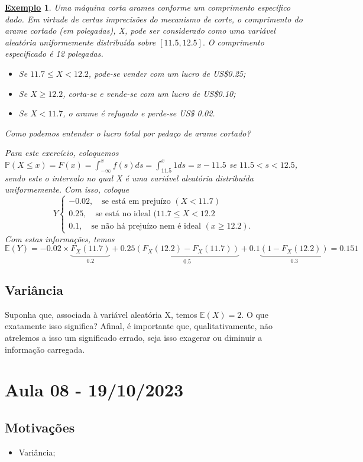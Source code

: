 \documentclass{article}
\newtheorem{example}{\underline{Exemplo}}
\begin{document}
\begin{example}
  Uma máquina corta arames conforme um comprimento específico dado. Em virtude de certas imprecisões do mecanismo de corte, o comprimento
do arame cortado (em polegadas), X, pode ser considerado como uma variável aleatória uniformemente distribuída sobre \([11.5, 12.5].\) O
comprimento especificado é 12 polegadas.
\begin{itemize}
  \item Se \(11.7\leq X < 12.2\), pode-se vender com um lucro de US\$0.25;
  \item Se \(X\geq 12.2\), corta-se e vende-se com um lucro de US\$0.10;
  \item Se \(X < 11.7\), o arame é refugado e perde-se US\$ 0.02.
\end{itemize}
Como podemos entender o lucro total por pedaço de arame cortado?
  
  Para este exercício, coloquemos \(\mathbb{P}(X\leq x) = F(x) = \int_{-\infty}^{x}f(s)ds = \int_{11.5}^{x}1ds = x - 11.5\) se \(11.5 < s < 12.5\), sendo este o intervalo no qual
X é uma variável aleatória distribuída uniformemente. Com isso, coloque 
  \[
    Y \left\{\begin{array}{ll}
        -0.02,\quad \text{se está em prejuízo }(X < 11.7)\\
        0.25,\quad \text{se está no ideal }(11.7\leq X < 12.2\\
        0.1,\quad \text{se não há prejuízo nem é ideal }(x\geq 12.2).
      \end{array}\right.
  \]
  Com estas informações, temos 
  \[
    \mathbb{E}(Y) = -0.02\times \underbrace{F_{X}(11.7)}_{0.2} + 0.25\underbrace{(F_{X}(12.2)-F_{X}(11.7))}_{0.5} + 0.1\underbrace{(1-F_{X}(12.2))}_{0.3} = 0.151
  \]
\end{example}
\subsection{Variância}
  Suponha que, associada à variável aleatória X, temos \(\mathbb{E}(X) = 2\). O que exatamente isso significa? Afinal, é importante que, qualitativamente,
não atrelemos a isso um significado errado, seja isso exagerar ou diminuir a informação carregada.
\newpage

\section{Aula 08 - 19/10/2023}
\subsection{Motivações} 
\begin{itemize}
  \item Variância;
\end{itemize}
\end{document}

